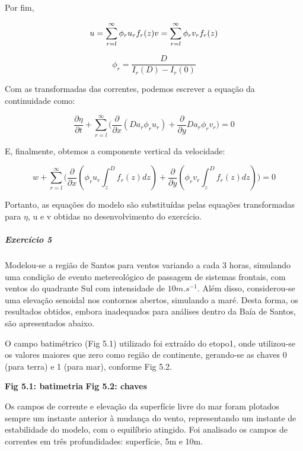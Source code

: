 \documentclass[11pt]{article}
\begin{document}
Por fim,

\begin{equation}
    u = \sum^{\infty}_{r=l} \phi_r u_r f_r(z)
    \\
    v = \sum^{\infty}_{r=l} \phi_r v_r f_r(z)
    \label{eq:4.14}
\end{equation}

\begin{equation}
    \phi_r = \frac{D}{I_r(D) - I_r(0)}
    \label{eq:4.15}
\end{equation}

Com as transformadas das correntes, podemos escrever a equação da
continuidade como:

\begin{equation}
    \frac{\partial{\eta}}{\partial{t}} + \sum^{\infty}_{r=l}\bigg( \frac{\partial}{\partial{x}}(D a_r \phi_r u_r) + \frac{\partial}{\partial{y}}D a_r \phi_r v_r \bigg) = 0
\end{equation}

E, finalmente, obtemos a componente vertical da velocidade:

\begin{equation}
    w + \sum^{\infty}_{r=l}\bigg( \frac{\partial}{\partial{x}}(\phi_r u_r\int^{D}_{z}f_r(z)dz) + \frac{\partial}{\partial{y}}(\phi_r v_r\int^{D}_{z}f_r(z)dz) \bigg) = 0
\end{equation}

Portanto, as equações do modelo são substituídas pelas equações
transformadas para \(\eta\), u e v obtidas no desenvolvimento do
exercício.

    \subparagraph{Exercício 5}\label{exercuxedcio-5}

Modelou-se a região de Santos para ventos variando a cada 3 horas,
simulando uma condição de evento metereológico de passagem de sistemas
frontais, com ventos do quadrante Sul com intensidade de
\(10 m.s^{-1}\). Além disso, considerou-se uma elevação senoidal nos
contornos abertos, simulando a maré. Desta forma, os resultados obtidos,
embora inadequados para análises dentro da Baía de Santos, são
apresentados abaixo.

O campo batimétrico (Fig 5.1) utilizado foi extraído do etopo1, onde
utilizou-se os valores maiores que zero como região de continente,
gerando-se as chaves 0 (para terra) e 1 (para mar), conforme Fig 5.2.

\textbf{Fig 5.1: batimetria} \textbf{Fig 5.2: chaves}

Os campos de corrente e elevação da superfície livre do mar foram
plotados sempre um instante anterior à mudança do vento, representando
um instante de estabilidade do modelo, com o equilíbrio atingido. Foi
analisado os campos de correntes em três profundidades: superfície, 5m e
10m.
\end{document}
